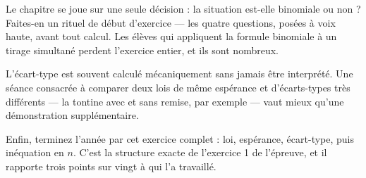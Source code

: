 \begin{notepourlaclasse}
Le chapitre se joue sur une seule décision : la situation est-elle binomiale
ou non ? Faites-en un rituel de début d'exercice — les quatre questions,
posées à voix haute, avant tout calcul. Les élèves qui appliquent la formule
binomiale à un tirage simultané perdent l'exercice entier, et ils sont
nombreux.

L'écart-type est souvent calculé mécaniquement sans jamais être interprété.
Une séance consacrée à comparer deux lois de même espérance et d'écarts-types
très différents — la tontine avec et sans remise, par exemple — vaut mieux
qu'une démonstration supplémentaire.

Enfin, terminez l'année par cet exercice complet : loi, espérance,
écart-type, puis inéquation en $n$. C'est la structure exacte de l'exercice 1
de l'épreuve, et il rapporte trois points sur vingt à qui l'a travaillé.
\end{notepourlaclasse}

